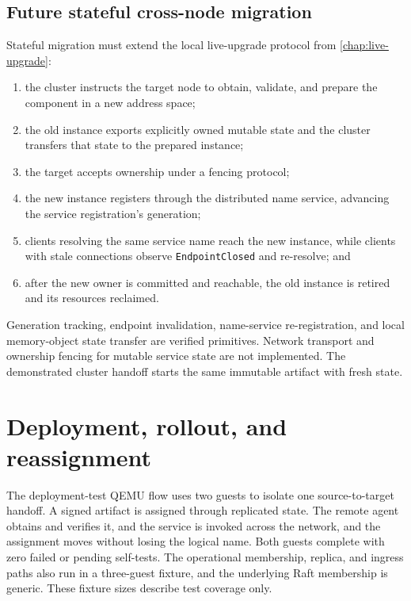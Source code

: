 \subsection{Future stateful cross-node migration}

Stateful migration must extend the local live-upgrade protocol from
\autoref{chap:live-upgrade}:

\begin{enumerate}
    \item the cluster instructs the target node to obtain, validate, and
        prepare the component in a new address space;
    \item the old instance exports explicitly owned mutable state and the
        cluster transfers that state to the prepared instance;
    \item the target accepts ownership under a fencing protocol;
    \item the new instance registers through the distributed name service,
        advancing the service registration's generation;
    \item clients resolving the same service name reach the new instance, while
        clients with stale connections observe \texttt{EndpointClosed} and
        re-resolve; and
    \item after the new owner is committed and reachable, the old instance is
        retired and its resources reclaimed.
\end{enumerate}

Generation tracking, endpoint invalidation, name-service re-registration,
and local memory-object state transfer are verified primitives. Network
transport and ownership fencing for mutable service state are not
implemented. The demonstrated cluster handoff starts the same immutable
artifact with fresh state.

\section{Deployment, rollout, and reassignment}

The deployment-test QEMU flow uses two guests to isolate one source-to-target
handoff. A signed artifact is assigned through replicated state. The remote
agent obtains and verifies it, and the service is invoked across the network, and
the assignment moves without losing the logical name. Both guests complete
with zero failed or pending self-tests. The operational membership, replica,
and ingress paths also run in a three-guest fixture, and the underlying Raft
membership is generic. These fixture sizes describe test coverage only.

